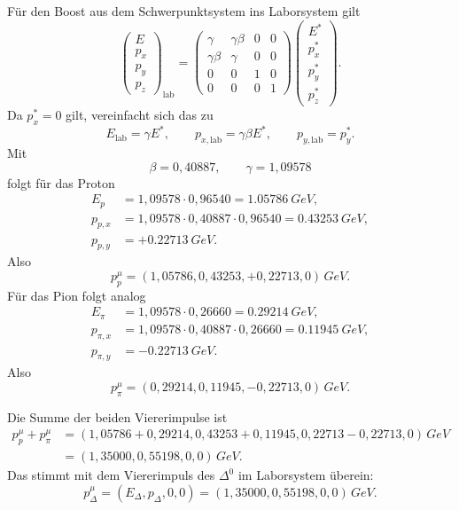 \documentclass[11pt,a4paper]{scrartcl}
\newcommand{\paren}[1]{\left( #1 \right)}
\newcommand{\GeV}{\si{GeV}}
\newcommand{\Dzero}{\Delta^0}
\newcommand{\fourp}[4]{\paren{#1,#2,#3,#4}}
\theoremstyle{definition}
\theoremstyle{plain}
\theoremstyle{remark}
\begin{document}
\begin{calculationbox}[title=Lorentztransformation]
F\"ur den Boost aus dem Schwerpunktsystem ins Laborsystem gilt
\[
\begin{pmatrix}
E\\ p_x\\ p_y\\ p_z
\end{pmatrix}_{\!\mathrm{lab}}
=
\begin{pmatrix}
\gamma & \gamma\beta & 0 & 0\\
\gamma\beta & \gamma & 0 & 0\\
0&0&1&0\\
0&0&0&1
\end{pmatrix}
\begin{pmatrix}
E^\ast\\ p_x^\ast\\ p_y^\ast\\ p_z^\ast
\end{pmatrix}.
\]
Da $p_x^\ast=0$ gilt, vereinfacht sich das zu
\[
    E_{\mathrm{lab}}=\gamma E^\ast,
    \qquad
    p_{x,\mathrm{lab}}=\gamma\beta E^\ast,
    \qquad
    p_{y,\mathrm{lab}}=p_y^\ast.
\]
Mit
\[
    \beta=0,40887,
    \qquad
    \gamma=1,09578
\]
folgt f\"ur das Proton
\begin{align*}
    E_p&=1,09578\cdot 0,96540=\SI{1,05786}{GeV},\\
    p_{p,x}&=1,09578\cdot 0,40887\cdot 0,96540=\SI{0,43253}{GeV},\\
    p_{p,y}&=+\SI{0,22713}{GeV}.
\end{align*}
Also
\[
    p_p^\mu=\fourp{1,05786}{0,43253}{+0,22713}{0}\,\GeV.
\]
F\"ur das Pion folgt analog
\begin{align*}
    E_\pi&=1,09578\cdot 0,26660=\SI{0,29214}{GeV},\\
    p_{\pi,x}&=1,09578\cdot 0,40887\cdot 0,26660=\SI{0,11945}{GeV},\\
    p_{\pi,y}&=-\SI{0,22713}{GeV}.
\end{align*}
Also
\[
    p_\pi^\mu=\fourp{0,29214}{0,11945}{-0,22713}{0}\,\GeV.
\]
\end{calculationbox}

\begin{calculationbox}[title=Kontrolle durch Summenbildung]
Die Summe der beiden Viererimpulse ist
\begin{align*}
    p_p^\mu+p_\pi^\mu
    &=\fourp{1,05786+0,29214}{0,43253+0,11945}{0,22713-0,22713}{0}\,\GeV\\
    &=\fourp{1,35000}{0,55198}{0}{0}\,\GeV.
\end{align*}
Das stimmt mit dem Viererimpuls des $\Dzero$ im Laborsystem \"uberein:
\[
    p_\Delta^\mu=(E_\Delta,p_\Delta,0,0)
    =\fourp{1,35000}{0,55198}{0}{0}\,\GeV.
\]
\end{calculationbox}
\end{document}
